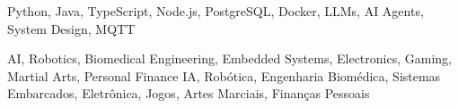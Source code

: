 
\noindent{}Python, Java, TypeScript, Node.js, PostgreSQL, Docker, LLMs, AI Agents, System Design, MQTT

\noindent
{}%
\tr%
{AI, Robotics, Biomedical Engineering, Embedded Systems, Electronics, Gaming, Martial Arts, Personal Finance}
{IA, Robótica, Engenharia Biomédica, Sistemas Embarcados, Eletrônica, Jogos, Artes Marciais, Finanças Pessoais}
